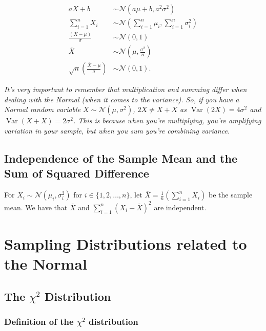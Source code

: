 \documentclass[a4paper, 12pt, twoside]{article}
\DeclareMathOperator{\Var}{Var}
\begin{document}
\begin{align*}
    aX + b                                                 & \sim \mathcal{N}(a\mu + b, a^2\sigma^2) \tag{Linear Transformation} \\
    \sum_{i = 1}^n X_i                                     & \sim
    \mathcal{N}(\sum_{i = 1}^n\mu_i, \sum_{i = 1}^n\sigma_i^2) \tag{Summed}                                                      \\
    \frac{(X - \mu)}{\sigma}                               & \sim \mathcal{N}(0, 1) \tag{Standardised}                           \\
    \overline{X}                                           & \sim \mathcal{N}(\mu, \frac{\sigma^2}{n}) \tag{Sample Mean}         \\
    \sqrt{n}\left(\frac{\overline{X} - \mu}{\sigma}\right) & \sim \mathcal{N}(0, 1). \tag{Standardised Sample Mean}
\end{align*}

\textit{It's very important to remember that multiplication and summing differ
    when dealing with the Normal (when it comes to the variance). So, if you have
    a Normal random variable $X \sim \mathcal{N}(\mu, \sigma^2)$, $2X \neq X + X$
    as $\Var(2X) = 4\sigma^2$ and $\Var(X + X) = 2\sigma^2$. This is because when
    you're multiplying, you're amplifying variation in your sample, but when you
    sum you're combining variance.}

\subsection{Independence of the Sample Mean and the Sum of Squared Difference}

For $X_i \sim \mathcal{N}(\mu_i, \sigma_i^2)$ for $i \in \{1, 2, \ldots, n\}$,
let $\overline{X} = \frac{1}{n}(\sum_{i = 1}^n X_i)$ be the sample mean.
We have that $\overline{X}$ and $\sum_{i = 1}^n(X_i - \overline{X})^2$
are independent.

\section{Sampling Distributions related to the Normal}

\subsection{The $\chi^2$ Distribution}

\subsubsection{Definition of the $\chi^2$ distribution}
\end{document}
